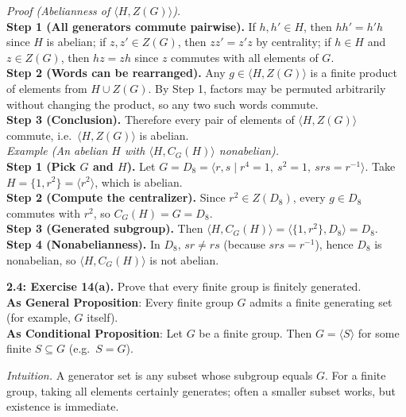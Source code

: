 \documentclass[12pt]{article}
\theoremstyle{definition}
\begin{document}
\dotfill

\emph{Proof (Abelianness of $\langle H,Z(G)\rangle$).}\\
\textbf{Step 1 (All generators commute pairwise).} If $h,h'\in H$, then $hh'=h'h$ since $H$ is abelian; if $z,z'\in Z(G)$, then $zz'=z'z$ by centrality; if $h\in H$ and $z\in Z(G)$, then $hz=zh$ since $z$ commutes with all elements of $G$.\\
\textbf{Step 2 (Words can be rearranged).} Any $g\in\langle H,Z(G)\rangle$ is a finite product of elements from $H\cup Z(G)$. By Step 1, factors may be permuted arbitrarily without changing the product, so any two such words commute.\\
\textbf{Step 3 (Conclusion).} Therefore every pair of elements of $\langle H,Z(G)\rangle$ commute, i.e.\ $\langle H,Z(G)\rangle$ is abelian.\\

\emph{Example (An abelian $H$ with $\langle H,C_G(H)\rangle$ nonabelian).}\\
\textbf{Step 1 (Pick $G$ and $H$).} Let $G=D_8=\langle r,s\mid r^4=1,\ s^2=1,\ srs=r^{-1}\rangle$. Take $H=\{1,r^2\}=\langle r^2\rangle$, which is abelian.\\
\textbf{Step 2 (Compute the centralizer).} Since $r^2\in Z(D_8)$, every $g\in D_8$ commutes with $r^2$, so $C_G(H)=G=D_8$.\\
\textbf{Step 3 (Generated subgroup).} Then $\langle H, C_G(H)\rangle=\langle \{1,r^2\}, D_8\rangle=D_8$.\\
\textbf{Step 4 (Nonabelianness).} In $D_8$, $sr\ne rs$ (because $srs=r^{-1}$), hence $D_8$ is nonabelian, so $\langle H, C_G(H)\rangle$ is not abelian.\\

\newpage

\noindent \textbf{2.4: Exercise 14(a).} Prove that every finite group is finitely generated.\\ %

\noindent\textbf{As General Proposition}: Every finite group $G$ admits a finite generating set (for example, $G$ itself).\\

\noindent \textbf{As Conditional Proposition}: Let $G$ be a finite group. Then $G=\langle S\rangle$ for some finite $S\subseteq G$ (e.g.\ $S=G$).

\newpage

\dotfill

\emph{Intuition.} A generator set is any subset whose subgroup equals $G$. For a finite group, taking all elements certainly generates; often a smaller subset works, but existence is immediate.\\
\end{document}
